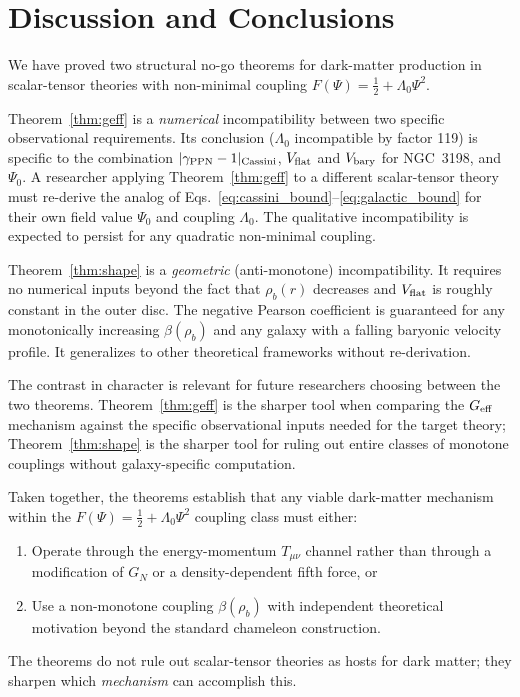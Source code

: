 \documentclass[12pt,a4paper]{article}
\theoremstyle{plain}
\newcommand{\rhob}{\rho_b}
\newcommand{\Vbary}{V_{\rm bary}}
\newcommand{\Vflat}{V_{\rm flat}}
\begin{document}
\section{Discussion and Conclusions}
\label{sec:conclusions}

We have proved two structural no-go theorems for dark-matter production in
scalar-tensor theories with non-minimal coupling $F(\Psi) = \tfrac{1}{2}
+ \Lambda_0\Psi^2$.

Theorem~\ref{thm:geff} is a \emph{numerical} incompatibility between
two specific observational requirements.  Its conclusion ($\Lambda_0$
incompatible by factor 119) is specific to the combination
$|\gamma_{\rm PPN}-1|_{\rm Cassini}$, $\Vflat$ and $\Vbary$ for NGC~3198,
and $\Psi_0$.  A researcher applying Theorem~\ref{thm:geff} to a different
scalar-tensor theory must re-derive the analog of
Eqs.~\eqref{eq:cassini_bound}--\eqref{eq:galactic_bound} for their own
field value $\Psi_0$ and coupling $\Lambda_0$.  The qualitative
incompatibility is expected to persist for any quadratic non-minimal
coupling.

Theorem~\ref{thm:shape} is a \emph{geometric} (anti-monotone)
incompatibility.  It requires no numerical inputs beyond the fact that
$\rhob(r)$ decreases and $V_{\rm flat}$ is roughly constant in the outer
disc.  The negative Pearson coefficient is guaranteed for any monotonically
increasing $\beta(\rhob)$ and any galaxy with a falling baryonic velocity
profile.  It generalizes to other theoretical frameworks without
re-derivation.

The contrast in character is relevant for future researchers choosing
between the two theorems.  Theorem~\ref{thm:geff} is the sharper tool
when comparing the $G_{\rm eff}$ mechanism against the specific observational
inputs needed for the target theory; Theorem~\ref{thm:shape} is the sharper
tool for ruling out entire classes of monotone couplings without
galaxy-specific computation.

Taken together, the theorems establish that any viable dark-matter
mechanism within the $F(\Psi) = \tfrac{1}{2}+\Lambda_0\Psi^2$ coupling
class must either:
\begin{enumerate}
  \item[(a)] Operate through the energy-momentum $T_{\mu\nu}$ channel
    rather than through a modification of $G_N$ or a density-dependent
    fifth force, or
  \item[(b)] Use a non-monotone coupling $\beta(\rhob)$ with independent
    theoretical motivation beyond the standard chameleon construction.
\end{enumerate}
The theorems do not rule out scalar-tensor theories as hosts for dark
matter; they sharpen which \emph{mechanism} can accomplish this.
\end{document}
